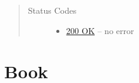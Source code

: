 \documentclass[letterpaper,10pt,english]{sphinxmanual}
\begin{document}
\begin{fulllineitems}
\begin{quote}
\begin{description}
\begin{itemize}
\end{itemize}

\item[{Status Codes}] \leavevmode\begin{itemize}
\item {} 
\href{http://www.w3.org/Protocols/rfc2616/rfc2616-sec10.html\#sec10.2.1}{200 OK} -- no error

\end{itemize}

\end{description}\end{quote}

\end{fulllineitems}



\section{Book}
\label{api/book::doc}\label{api/book:book}
\end{document}
